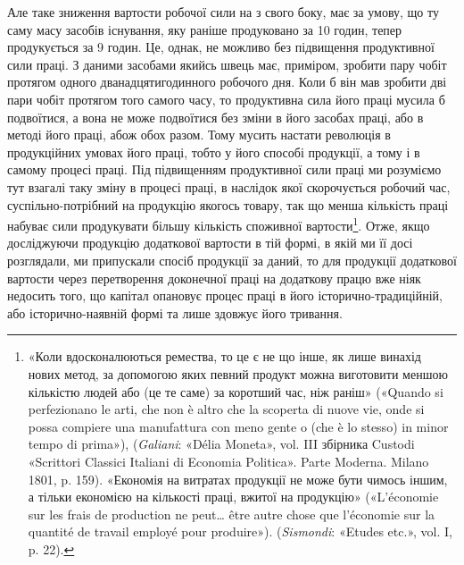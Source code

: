 Але таке зниження вартости робочої сили на  з свого боку,
має за умову, що ту саму масу засобів існування, яку раніше
продуковано за 10 годин, тепер продукується за 9 годин. Це, однак,
не можливо без підвищення продуктивної сили праці. З даними
засобами якийсь швець має, приміром, зробити пару чобіт
протягом одного дванадцятигодинного робочого дня. Коли б він
мав зробити дві пари чобіт протягом того самого часу, то продуктивна
сила його праці мусила б подвоїтися, а вона не може подвоїтися
без зміни в його засобах праці, або в методі його праці,
абож обох разом. Тому мусить настати революція в продукційних
умовах його праці, тобто у його способі продукції, а тому і в самому
процесі праці. Під підвищенням продуктивної сили праці ми розуміємо
тут взагалі таку зміну в процесі праці, в наслідок якої
скорочується робочий час, суспільно-потрібний на продукцію
якогось товару, так що менша кількість праці набуває сили продукувати
більшу кількість споживної вартости\footnote{
«Коли вдосконалюються ремества, то це є не що інше, як лише
винахід нових метод, за допомогою яких певний продукт можна виготовити
меншою кількістю людей або (це те саме) за коротший час, ніж
раніш» («Quando si perfezionano le arti, che non è altro che la scoperta
di nuove vie, onde si possa compiere una manufattura con meno gente o
(che è lo stesso) in minor tempo di prima»), (\emph{Galiani}: «Délia Moneta»,
vol. III збірника Custodi «Scrittori Classici Italiani di Economia Politica».
Parte Moderna. Milano 1801, p. 159). «Економія на витратах продукції
не може бути чимось іншим, а тільки економією на кількості
праці, вжитої на продукцію» («L'économie sur les frais de production
ne peut\dots{} être autre chose que l’économie sur la quantité de travail employé
pour produire»). (\emph{Sismondi}: «Etudes etc.», vol. I, p. 22).
}. Отже, якщо
досліджуючи продукцію додаткової вартости в тій формі, в якій
ми її досі розглядали, ми припускали спосіб продукції за даний,
то для продукції додаткової вартости через перетворення доконечної
праці на додаткову працю вже ніяк недосить того, що
капітал опановує процес праці в його історично-традиційній,
або історично-наявній формі та лише здовжує його тривання.
\parbreak{}  %
